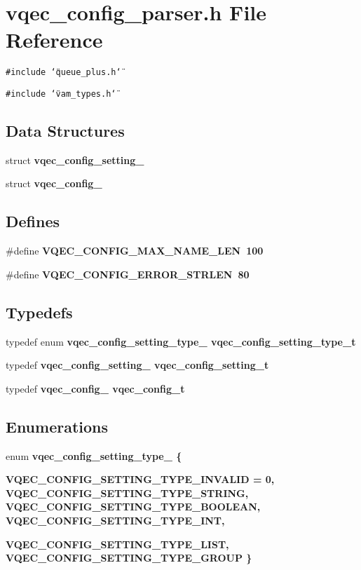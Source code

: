 \section{vqec\_\-config\_\-parser.h File Reference}
\label{vqec__config__parser_8h}
{\tt \#include \char`\"{}queue\_\-plus.h\char`\"{}}\par
{\tt \#include \char`\"{}vam\_\-types.h\char`\"{}}\par
\subsection*{Data Structures}
\begin{CompactItemize}
\item 
struct \bf{vqec\_\-config\_\-setting\_\-}
\item 
struct \bf{vqec\_\-config\_\-}
\end{CompactItemize}
\subsection*{Defines}
\begin{CompactItemize}
\item 
\#define \bf{VQEC\_\-CONFIG\_\-MAX\_\-NAME\_\-LEN}~100
\item 
\#define \bf{VQEC\_\-CONFIG\_\-ERROR\_\-STRLEN}~80
\end{CompactItemize}
\subsection*{Typedefs}
\begin{CompactItemize}
\item 
typedef enum \bf{vqec\_\-config\_\-setting\_\-type\_\-} \bf{vqec\_\-config\_\-setting\_\-type\_\-t}
\item 
typedef \bf{vqec\_\-config\_\-setting\_\-} \bf{vqec\_\-config\_\-setting\_\-t}
\item 
typedef \bf{vqec\_\-config\_\-} \bf{vqec\_\-config\_\-t}
\end{CompactItemize}
\subsection*{Enumerations}
\begin{CompactItemize}
\item 
enum \bf{vqec\_\-config\_\-setting\_\-type\_\-} \{ \par
\bf{VQEC\_\-CONFIG\_\-SETTING\_\-TYPE\_\-INVALID} =  0, 
\bf{VQEC\_\-CONFIG\_\-SETTING\_\-TYPE\_\-STRING}, 
\bf{VQEC\_\-CONFIG\_\-SETTING\_\-TYPE\_\-BOOLEAN}, 
\bf{VQEC\_\-CONFIG\_\-SETTING\_\-TYPE\_\-INT}, 
\par
\bf{VQEC\_\-CONFIG\_\-SETTING\_\-TYPE\_\-LIST}, 
\bf{VQEC\_\-CONFIG\_\-SETTING\_\-TYPE\_\-GROUP}
 \}
\end{CompactItemize}
